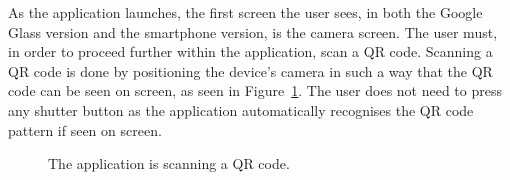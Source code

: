 As the application launches, the first screen the user sees, in both the Google Glass version and the smartphone version, is the camera screen. The user must, in order to proceed further within the application, scan a QR code. Scanning a QR code is done by positioning the device's camera in such a way that the QR code can be seen on screen, as seen in Figure~\ref{glassDemoQR}. The user does not need to press any shutter button as the application automatically recognises the QR code pattern if seen on screen.%

	
	\begin{figure}[ht!]
		\centering
   		 \qquad
   		 \qquad
		\caption{The application is scanning a QR code.}
		\label{glassDemoQR}
	\end{figure}

